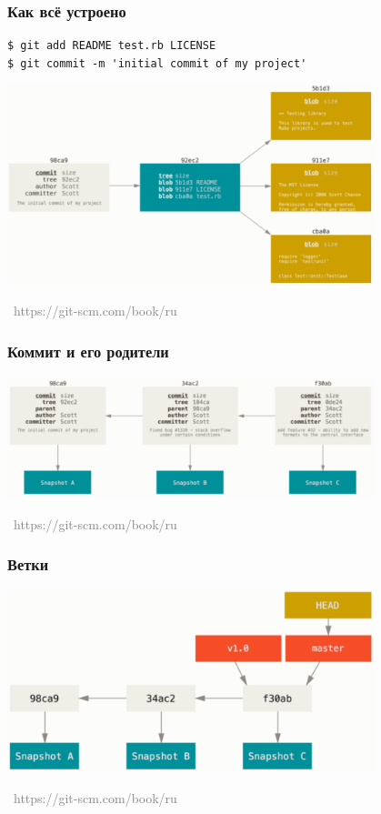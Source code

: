 \documentclass[xetex,mathserif,serif]{beamer}
\newcommand{\attribution}[1] {
\vspace{-5mm}\begin{flushright}\begin{scriptsize}\textcolor{gray}{\textcopyright\, #1}\end{scriptsize}\end{flushright}
}
\begin{document}
	\begin{frame}[fragile]
		\frametitle{Как всё устроено}
		\begin{verbatim}
$ git add README test.rb LICENSE
$ git commit -m 'initial commit of my project'
		\end{verbatim}
		\begin{center}
			\includegraphics[width=0.8\textwidth]{blobs.png}
			\attribution{https://git-scm.com/book/ru}
		\end{center}
	\end{frame}

	\begin{frame}
		\frametitle{Коммит и его родители}
		\begin{center}
			\includegraphics[width=0.8\textwidth]{commits.png}
			\attribution{https://git-scm.com/book/ru}
		\end{center}
	\end{frame}

	\begin{frame}
		\frametitle{Ветки}
		\begin{center}
			\includegraphics[width=0.8\textwidth]{branches.png}
			\attribution{https://git-scm.com/book/ru}
		\end{center}
	\end{frame}
\end{document}
